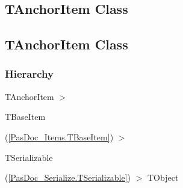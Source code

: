 \documentclass{report}
\begin{document}
\subsection*{\large{\textbf{TAnchorItem Class}}\normalsize\hspace{1ex}\hrulefill}
\else
\subsection*{TAnchorItem Class}
\fi
\label{PasDoc_Items.TAnchorItem}
\subsubsection*{\large{\textbf{Hierarchy}}\normalsize\hspace{1ex}\hfill}
TAnchorItem {$>$} \begin{ttfamily}TBaseItem\end{ttfamily}(\ref{PasDoc_Items.TBaseItem}) {$>$} \begin{ttfamily}TSerializable\end{ttfamily}(\ref{PasDoc_Serialize.TSerializable}) {$>$} 
TObject
\end{document}
